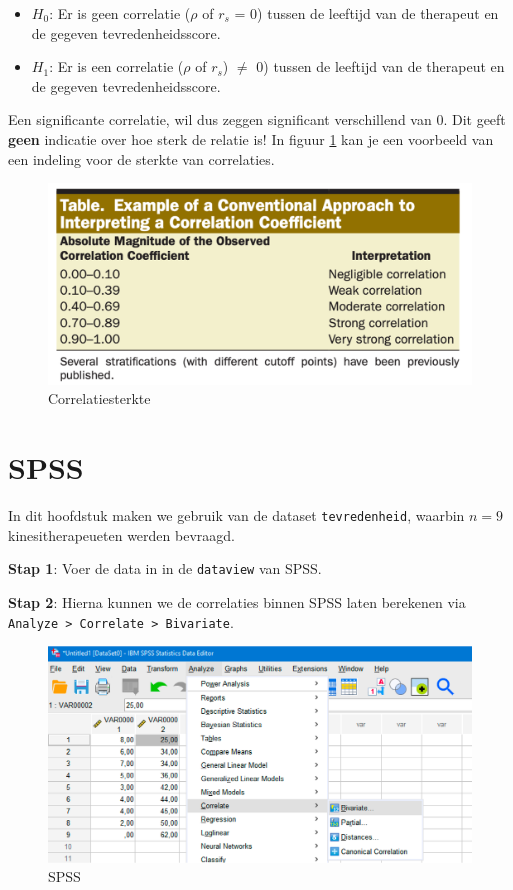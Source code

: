 \documentclass[
]{book}
\providecommand{\tightlist}{%
  \setlength{\itemsep}{0pt}\setlength{\parskip}{0pt}}
\theoremstyle{definition}
\theoremstyle{definition}
\theoremstyle{definition}
\theoremstyle{definition}
\theoremstyle{remark}
\begin{document}
\begin{itemize}
\tightlist
\item
  \(H_0\): Er is geen correlatie (\(\rho\) of \(r_s\) = 0) tussen de leeftijd van de therapeut en de gegeven tevredenheidsscore.
\item
  \(H_1\): Er is een correlatie (\(\rho\) of \(r_s\)) \(\neq\) 0) tussen de leeftijd van de therapeut en de gegeven tevredenheidsscore.
\end{itemize}

Een significante correlatie, wil dus zeggen significant verschillend van 0. Dit geeft \textbf{geen} indicatie over hoe sterk de relatie is! In figuur \ref{fig:corrmagn} kan je een voorbeeld van een indeling voor de sterkte van correlaties.

\begin{figure}
\includegraphics[width=1\linewidth]{img/corr_magn} \caption{Correlatiesterkte}\label{fig:corrmagn}
\end{figure}

\hypertarget{spss}{%
\section*{SPSS}\label{spss}}


In dit hoofdstuk maken we gebruik van de dataset \texttt{tevredenheid}, waarbin \(n=9\) kinesitherapeueten werden bevraagd.

\textbf{Stap 1}: Voer de data in in de \texttt{dataview} van {SPSS}.

\textbf{Stap 2}: Hierna kunnen we de correlaties binnen {SPSS} laten berekenen via \texttt{Analyze\ \textgreater{}\ Correlate\ \textgreater{}\ Bivariate}.

\begin{figure}
\includegraphics[width=0.75\linewidth]{img/spss_corr_1} \caption{SPSS}\label{fig:corrspss1}
\end{figure}
\end{document}
